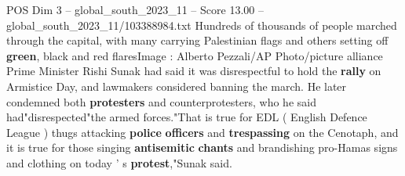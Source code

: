 \begin{textsample}{POS Dim 3 – global\_south\_2023\_11 – Score 13.00 – global\_south\_2023\_11/103388984.txt}
Hundreds of thousands of people marched through the capital, with many carrying Palestinian flags and others setting off \textbf{green}, black and red flaresImage : Alberto Pezzali/AP Photo/picture alliance Prime Minister Rishi Sunak had said it was disrespectful to hold the \textbf{rally} on Armistice Day, and lawmakers considered banning the march.
He later condemned both \textbf{protesters} and counterprotesters, who he said had"disrespected"the armed forces."That is true for EDL ( English Defence League ) thugs attacking \textbf{police} \textbf{officers} and \textbf{trespassing} on the Cenotaph, and it is true for those singing \textbf{antisemitic} \textbf{chants} and brandishing pro-Hamas signs and clothing on today ' s \textbf{protest},"Sunak said.

\end{textsample}
